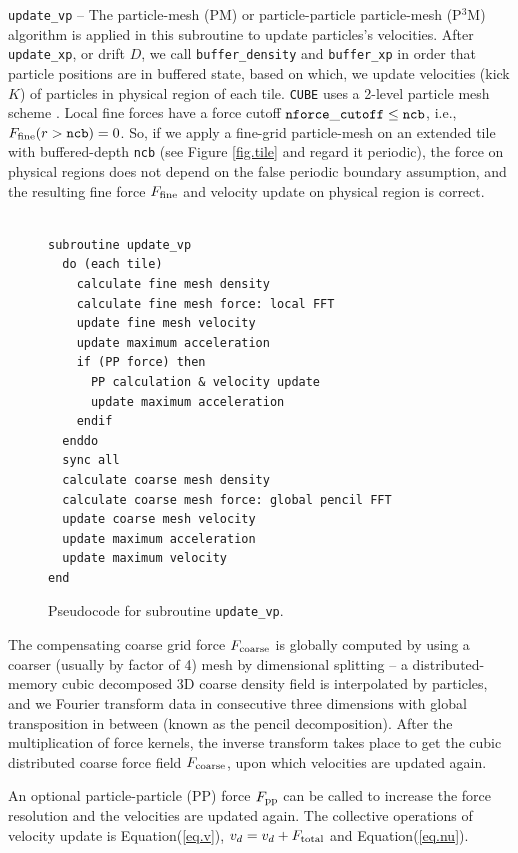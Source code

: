 \documentclass[10pt,twocolumn,preprint]{emulateapj}
\begin{document}
{\tt update\_vp} -- 
The particle-mesh (PM) or particle-particle particle-mesh (P$^3$M) algorithm is applied in this subroutine to update particles's velocities.
After {\tt update\_xp}, or drift $D$, we call {\tt buffer\_density} and {\tt buffer\_xp} in order that particle positions are in buffered state, based on which, we update velocities (kick $K$) of particles in physical region of each tile. {\tt CUBE} uses a 2-level particle mesh scheme \citep{2005NewA...10..393M,2013MNRAS.436..540H}. Local fine forces have a force cutoff ${\tt nforce\_cutoff}\leq{\tt ncb}$, i.e., $F_{\rm fine}(r>{\tt ncb})=0$. So, if we apply a fine-grid particle-mesh on an extended tile with buffered-depth {\tt ncb} (see Figure \ref{fig.tile} and regard it periodic), the force on physical regions does not depend on the false periodic boundary assumption, and the resulting fine force $F_{\rm fine}$ and velocity update on physical region is correct.

\begin{figure}[]
\begin{verbatim}

subroutine update_vp
  do (each tile)
    calculate fine mesh density
    calculate fine mesh force: local FFT
    update fine mesh velocity
    update maximum acceleration
    if (PP force) then
      PP calculation & velocity update
      update maximum acceleration
    endif
  enddo
  sync all
  calculate coarse mesh density
  calculate coarse mesh force: global pencil FFT
  update coarse mesh velocity
  update maximum acceleration
  update maximum velocity
end
\end{verbatim}
\caption{Pseudocode for subroutine {\tt update\_vp}.}
\label{fig.update_vp}
\end{figure}



The compensating coarse grid force $F_{\rm coarse}$ is globally computed by using a coarser (usually by factor of 4) mesh by dimensional splitting -- a distributed-memory cubic decomposed 3D coarse density field is interpolated by particles, and we Fourier transform data in consecutive three dimensions with global transposition in between (known as the pencil decomposition). After the multiplication of force kernels, the inverse transform takes place to get the cubic distributed coarse force field $F_{\rm coarse}$, upon which velocities are updated again.

An optional particle-particle (PP) force $F_{\rm pp}$ can be called to increase the force resolution and the velocities are updated again. The collective operations of velocity update is Equation(\ref{eq.v}), $v_d=v_d+F_{\rm total}$ and Equation(\ref{eq.nu}).
\end{document}
